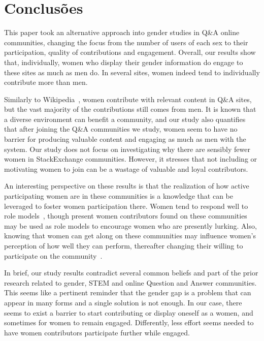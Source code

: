 \chapter{Conclusões}

This paper took an alternative approach into gender studies in Q\&A online communities, changing the focus from the number of users of each sex to their participation, quality of contributions and engagement. Overall, our results show that, individually, women who display their gender information do engage to these sites as much as men do. In several sites, women indeed tend to individually contribute more than men. 

Similarly to Wikipedia~\cite{lam2011wp}, women contribute with relevant content in Q\&A sites, but the vast majority of the contributions still comes from men. It is known that a diverse environment can benefit a community, and our study also quantifies that after joining the Q\&A communities we study, women seem to have no barrier for producing valuable content and engaging as much as men with the system. Our study does not focus on investigating why there are sensibly fewer women in StackExchange communities. However, it stresses that not including or motivating women to join can be a wastage of valuable and loyal contributors.

An interesting perspective on these results is that the realization of how active participating women are in these communities is a knowledge that can be leveraged to foster women participation there. Women tend to respond well to role models~\cite{smith1986effect, nixon1999educational}, though present women contributors found on these communities may be used as role models to encourage women who are presently lurking. Also, knowing that women can get along on these communities may influence women's perception of how well they can perform, thereafter changing their willing to participate on the community~\cite{ehrlinger2003chronic}.

In brief, our study results contradict several common beliefs and part of the prior research related to gender, STEM and online Question and Answer communities. This seems like a pertinent reminder that the gender gap is a problem that can appear in many forms and a single solution is not enough. In our case, there seems to exist a barrier to start contributing or display oneself as a women, and sometimes for women to remain engaged. Differently, less effort seems needed to have women contributors participate further while engaged. 


